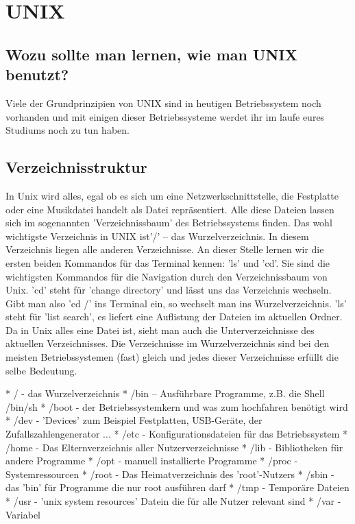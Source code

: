 \section {UNIX}

\subsection {Wozu sollte man lernen, wie man UNIX benutzt?}
Viele der Grundprinzipien von UNIX sind in heutigen Betriebssystem noch vorhanden und mit einigen dieser Betriebssysteme werdet ihr im laufe eures Studiums noch zu tun haben.

\subsection {Verzeichnisstruktur}
In Unix wird alles, egal ob es sich um eine Netzwerkschnittstelle, die Festplatte oder eine Musikdatei handelt als Datei repräsentiert. Alle diese Dateien lassen sich im sogenannten 'Verzeichnissbaum' des Betriebssystems finden. Das wohl wichtigste Verzeichnis in UNIX ist'/' – das Wurzelverzeichnis. In diesem Verzeichnis liegen alle anderen Verzeichnisse.
An dieser Stelle lernen wir die ersten beiden Kommandos für das Terminal kennen: 'ls' und 'cd'. Sie sind die wichtigsten Kommandos für die Navigation durch den Verzeichnissbaum von Unix. 'cd' steht für 'change directory' und lässt uns das Verzeichnis wechseln. Gibt man also 'cd /' ins Terminal ein, so wechselt man ins Wurzelverzeichnis. 'ls' steht für 'list search', es liefert eine Auflistung der Dateien im aktuellen Ordner.
Da in Unix alles eine Datei ist, sieht man auch die Unterverzeichnisse des aktuellen Verzeichnisses.
Die Verzeichnisse im Wurzelverzeichnis sind bei den meisten Betriebssystemen (fast) gleich und jedes dieser Verzeichnisse erfüllt die selbe Bedeutung.

* / - das Wurzelverzeichnis
* /bin – Ausführbare Programme, z.B. die Shell /bin/sh 
* /boot - der Betriebssystemkern und was zum hochfahren benötigt wird
* /dev - 'Devices' zum Beispiel Festplatten, USB-Geräte, der Zufallszahlengenerator ...
* /etc - Konfigurationsdateien für das Betriebssystem 
* /home - Das Elternverzeichnis aller Nutzerverzeichnisse
* /lib - Bibliotheken für andere Programme
* /opt - manuell installierte Programme
* /proc - Systemressourcen
* /root - Das Heimatverzeichnis des 'root'-Nutzers
* /sbin - das 'bin' für Programme die nur root ausführen darf
* /tmp - Temporäre Dateien
* /usr - 'unix system resources' Datein die für alle Nutzer relevant sind
* /var - Variabel

